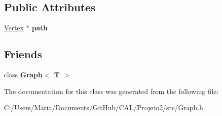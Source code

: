 \subsection*{Public Attributes}
\begin{DoxyCompactItemize}
\item 
\hypertarget{class_vertex_abd40febd917aa25add6bd42237c8463a}{}\label{class_vertex_abd40febd917aa25add6bd42237c8463a} 
\hyperlink{class_vertex}{Vertex} $\ast$ {\bfseries path}
\end{DoxyCompactItemize}
\subsection*{Friends}
\begin{DoxyCompactItemize}
\item 
\hypertarget{class_vertex_aefa9b76cd57411c5354e5620dc2d84dd}{}\label{class_vertex_aefa9b76cd57411c5354e5620dc2d84dd} 
class {\bfseries Graph$<$ T $>$}
\end{DoxyCompactItemize}


The documentation for this class was generated from the following file\+:\begin{DoxyCompactItemize}
\item 
C\+:/\+Users/\+Maria/\+Documents/\+Git\+Hub/\+C\+A\+L/\+Projeto2/src/Graph.\+h\end{DoxyCompactItemize}

